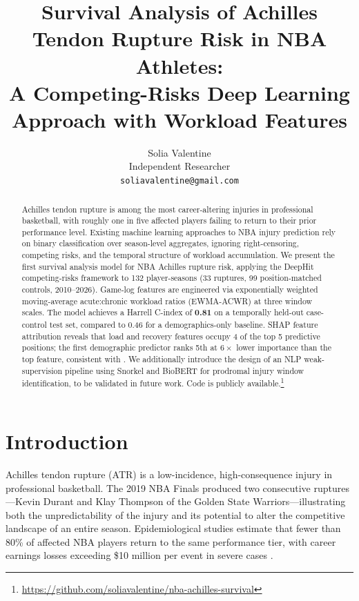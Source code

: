 \documentclass{article}
\title{Survival Analysis of Achilles Tendon Rupture Risk in NBA Athletes:\\
A Competing-Risks Deep Learning Approach with Workload Features}
\author{%
  Solia Valentine \\
  Independent Researcher \\
  \texttt{soliavalentine@gmail.com}
}
\begin{document}
\maketitle

\begin{abstract}
Achilles tendon rupture is among the most career-altering injuries in
professional basketball, with roughly one in five affected players failing to
return to their prior performance level.  Existing machine learning approaches
to NBA injury prediction rely on binary classification over season-level
aggregates, ignoring right-censoring, competing risks, and the temporal
structure of workload accumulation.  We present the first survival analysis
model for NBA Achilles rupture risk, applying the DeepHit competing-risks
framework to 132 player-seasons (33 ruptures, 99 position-matched controls,
2010--2026).  Game-log features are engineered via exponentially weighted
moving-average acute:chronic workload ratios (EWMA-ACWR) at three window
scales.  The model achieves a Harrell C-index of \textbf{0.81} on a temporally
held-out case-control test set, compared to 0.46 for a demographics-only
baseline.  SHAP feature attribution reveals that load and recovery features
occupy 4 of the top 5 predictive positions; the first demographic predictor
ranks 5th at $6\times$ lower importance than the top feature, consistent with
\citet{gabbett2016}.  We additionally introduce the design of an NLP weak-supervision
pipeline using Snorkel \citep{ratner2017snorkel} and BioBERT for prodromal
injury window identification, to be validated in future work.  Code is publicly
available.\footnote{\url{https://github.com/soliavalentine/nba-achilles-survival}}
\end{abstract}

\section{Introduction}
\label{sec:intro}

Achilles tendon rupture (ATR) is a low-incidence, high-consequence injury in
professional basketball.  The 2019 NBA Finals produced two consecutive ruptures
---Kevin Durant and Klay Thompson of the Golden State Warriors---illustrating
both the unpredictability of the injury and its potential to alter the
competitive landscape of an entire season.  Epidemiological studies estimate
that fewer than 80\% of affected NBA players return to the same performance
tier, with career earnings losses exceeding \$10 million per event in severe
cases \citep{torresronda2022}.
\end{document}
